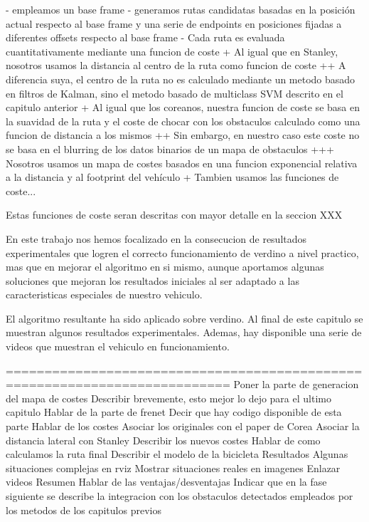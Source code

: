 - empleamos un base frame
- generamos rutas candidatas basadas en la posición actual respecto al base frame y una serie de endpoints en posiciones fijadas a diferentes offsets respecto al base frame
- Cada ruta es evaluada cuantitativamente mediante una funcion de coste
  + Al igual que en Stanley, nosotros usamos la distancia al centro de la ruta como funcion de coste
    ++ A diferencia suya, el centro de la ruta no es calculado mediante un metodo basado en filtros de Kalman, sino el metodo basado de multiclass SVM descrito en el capitulo anterior
  + Al igual que los coreanos, nuestra funcion de coste se basa en la suavidad de la ruta y el coste de chocar con los obstaculos calculado como una funcion de distancia a los mismos
    ++ Sin embargo, en nuestro caso este coste no se basa en el blurring de los datos binarios de un mapa de obstaculos
      +++ Nosotros usamos un mapa de costes basados en una funcion exponencial relativa a la distancia y al footprint del vehículo
  + Tambien usamos las funciones de coste...

Estas funciones de coste seran descritas con mayor detalle en la seccion XXX

En este trabajo nos hemos focalizado en la consecucion de resultados experimentales que logren el correcto funcionamiento de verdino a nivel practico, mas que en mejorar el algoritmo en si mismo, aunque aportamos algunas soluciones que mejoran los resultados iniciales al ser adaptado a las caracteristicas especiales de nuestro vehiculo.

El algoritmo resultante ha sido aplicado sobre verdino. Al final de este capitulo se muestran algunos resultados experimentales. Ademas, hay disponible una serie de videos que muestran el vehiculo en funcionamiento.
  
===========================================================================
Poner la parte de generacion del mapa de costes
  Describir brevemente, esto mejor lo dejo para el ultimo capitulo
Hablar de la parte de frenet
  Decir que hay codigo disponible de esta parte
Hablar de los costes
  Asociar los originales con el paper de Corea
  Asociar la distancia lateral con Stanley
  Describir los nuevos costes
Hablar de como calculamos la ruta final
  Describir el modelo de la bicicleta
Resultados
  Algunas situaciones complejas en rviz
  Mostrar situaciones reales en imagenes
  Enlazar videos
Resumen
  Hablar de las ventajas/desventajas
  Indicar que en la fase siguiente se describe la integracion con los obstaculos detectados empleados por los metodos de los capitulos previos
  
